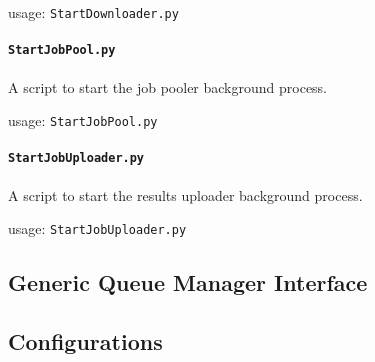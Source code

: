 usage: \texttt{StartDownloader.py}

\paragraph{\texttt{StartJobPool.py}}
A script to start the job pooler background process.

usage: \texttt{StartJobPool.py}

\paragraph{\texttt{StartJobUploader.py}}
A script to start the results uploader background process.

usage: \texttt{StartJobUploader.py}

\subsection{Generic Queue Manager Interface}

\subsection{Configurations}


